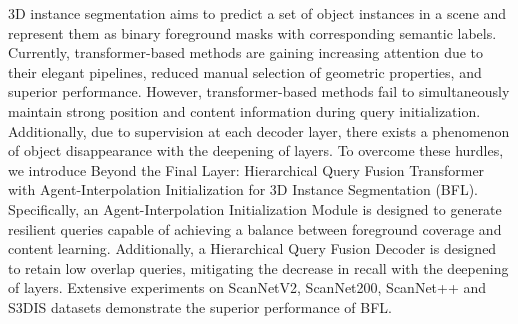 3D instance segmentation aims to predict a set of object instances in a scene and represent them as binary foreground masks with corresponding semantic labels. 
Currently, transformer-based methods are gaining increasing attention due to their elegant pipelines, reduced manual selection of geometric properties, and superior performance.
However, transformer-based methods fail to simultaneously maintain strong position and content information during query initialization. Additionally, due to supervision at each decoder layer, there exists a phenomenon of object disappearance with the deepening of layers.
%
To overcome these hurdles, we introduce Beyond the Final Layer: Hierarchical Query
Fusion Transformer with Agent-Interpolation
Initialization for 3D Instance Segmentation (BFL). 
%
Specifically, an Agent-Interpolation Initialization Module is designed to generate resilient queries capable of achieving a balance between foreground coverage and content learning.
%
Additionally, a Hierarchical Query Fusion Decoder is designed to retain low overlap queries, mitigating the decrease in recall with the deepening of layers. 
%
Extensive experiments on ScanNetV2, ScanNet200, ScanNet++ and S3DIS datasets 
demonstrate the superior performance of BFL.

